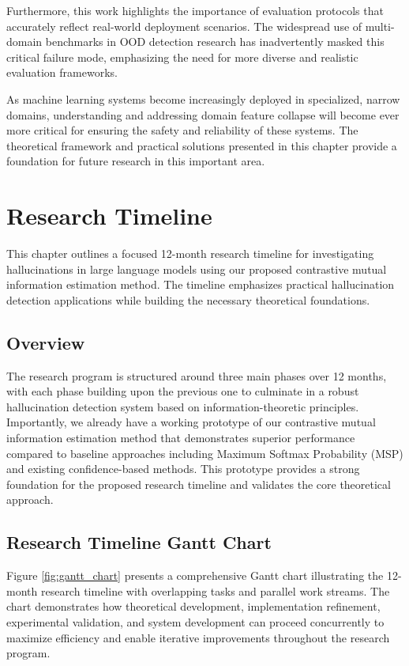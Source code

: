 \documentclass[11pt, oneside]{book}
\theoremstyle{plain}
\theoremstyle{definition}
\theoremstyle{remark}
\begin{document}
Furthermore, this work highlights the importance of evaluation protocols that accurately reflect real-world deployment scenarios. The widespread use of multi-domain benchmarks in OOD detection research has inadvertently masked this critical failure mode, emphasizing the need for more diverse and realistic evaluation frameworks.

As machine learning systems become increasingly deployed in specialized, narrow domains, understanding and addressing domain feature collapse will become ever more critical for ensuring the safety and reliability of these systems. The theoretical framework and practical solutions presented in this chapter provide a foundation for future research in this important area.





\chapter{Research Timeline}

This chapter outlines a focused 12-month research timeline for investigating hallucinations in large language models using our proposed contrastive mutual information estimation method. The timeline emphasizes practical hallucination detection applications while building the necessary theoretical foundations.

\section{Overview}

The research program is structured around three main phases over 12 months, with each phase building upon the previous one to culminate in a robust hallucination detection system based on information-theoretic principles. Importantly, we already have a working prototype of our contrastive mutual information estimation method that demonstrates superior performance compared to baseline approaches including Maximum Softmax Probability (MSP) and existing confidence-based methods. This prototype provides a strong foundation for the proposed research timeline and validates the core theoretical approach.

\section{Research Timeline Gantt Chart}

Figure \ref{fig:gantt_chart} presents a comprehensive Gantt chart illustrating the 12-month research timeline with overlapping tasks and parallel work streams. The chart demonstrates how theoretical development, implementation refinement, experimental validation, and system development can proceed concurrently to maximize efficiency and enable iterative improvements throughout the research program.
\end{document}
